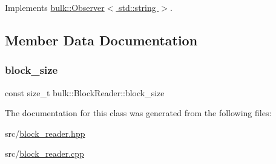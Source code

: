 Implements \hyperlink{classbulk_1_1Observer_af17104660bf8b287e467213c4efbee2e}{bulk\+::\+Observer$<$ std\+::string $>$}.



\subsection{Member Data Documentation}
\mbox{\label{classbulk_1_1BlockReader_a368298f7d12180b3a59597b605154b1d}} 
\subsubsection{\texorpdfstring{block\+\_\+size}{block\_size}}
{\footnotesize\ttfamily const size\+\_\+t bulk\+::\+Block\+Reader\+::block\+\_\+size}



The documentation for this class was generated from the following files\+:\begin{DoxyCompactItemize}
\item 
src/\hyperlink{block__reader_8hpp}{block\+\_\+reader.\+hpp}\item 
src/\hyperlink{block__reader_8cpp}{block\+\_\+reader.\+cpp}\end{DoxyCompactItemize}
